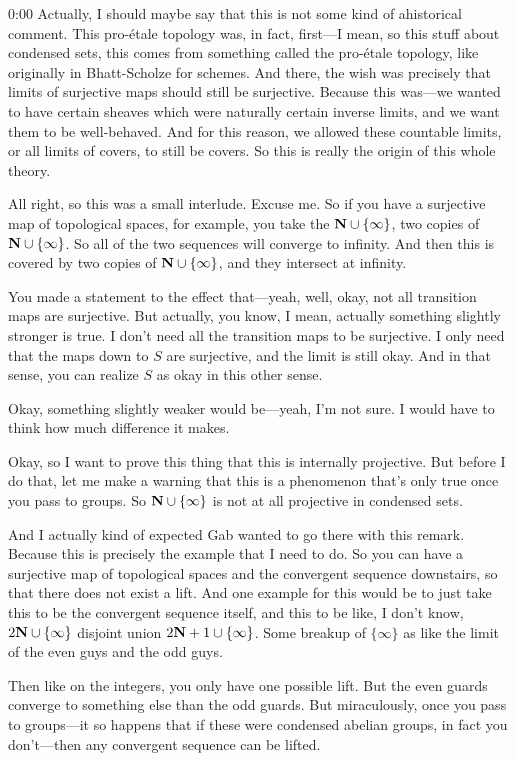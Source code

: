 \begin{unfinished}{0:00}
Actually, I should maybe say that this is not some kind of ahistorical comment. This pro-étale topology was, in fact, first---I mean, so this stuff about condensed sets, this comes from something called the pro-étale topology, like originally in Bhatt-Scholze for schemes. And there, the wish was precisely that limits of surjective maps should still be surjective. Because this was---we wanted to have certain sheaves which were naturally certain inverse limits, and we want them to be well-behaved. And for this reason, we allowed these countable limits, or all limits of covers, to still be covers. So this is really the origin of this whole theory.

All right, so this was a small interlude. Excuse me. So if you have a surjective map of topological spaces, for example, you take the $\mathbf N \cup \{\infty\}$, two copies of $\mathbf N \cup \{\infty\}$. So all of the two sequences will converge to infinity. And then this is covered by two copies of $\mathbf N \cup \{\infty\}$, and they intersect at infinity.

You made a statement to the effect that---yeah, well, okay, not all transition maps are surjective. But actually, you know, I mean, actually something slightly stronger is true. I don't need all the transition maps to be surjective. I only need that the maps down to $S$ are surjective, and the limit is still okay. And in that sense, you can realize $S$ as okay in this other sense.

Okay, something slightly weaker would be---yeah, I'm not sure. I would have to think how much difference it makes.

Okay, so I want to prove this thing that this is internally projective. But before I do that, let me make a warning that this is a phenomenon that's only true once you pass to groups. So $\mathbf N \cup \{\infty\}$ is not at all projective in condensed sets.

And I actually kind of expected Gab wanted to go there with this remark. Because this is precisely the example that I need to do. So you can have a surjective map of topological spaces and the convergent sequence downstairs, so that there does not exist a lift. And one example for this would be to just take this to be the convergent sequence itself, and this to be like, I don't know, $2\mathbf N \cup \{\infty\}$ disjoint union $2\mathbf N+1 \cup \{\infty\}$. Some breakup of $\{\infty\}$ as like the limit of the even guys and the odd guys.

Then like on the integers, you only have one possible lift. But the even guards converge to something else than the odd guards. But miraculously, once you pass to groups---it so happens that if these were condensed abelian groups, in fact you don't---then any convergent sequence can be lifted.


\end{unfinished}
